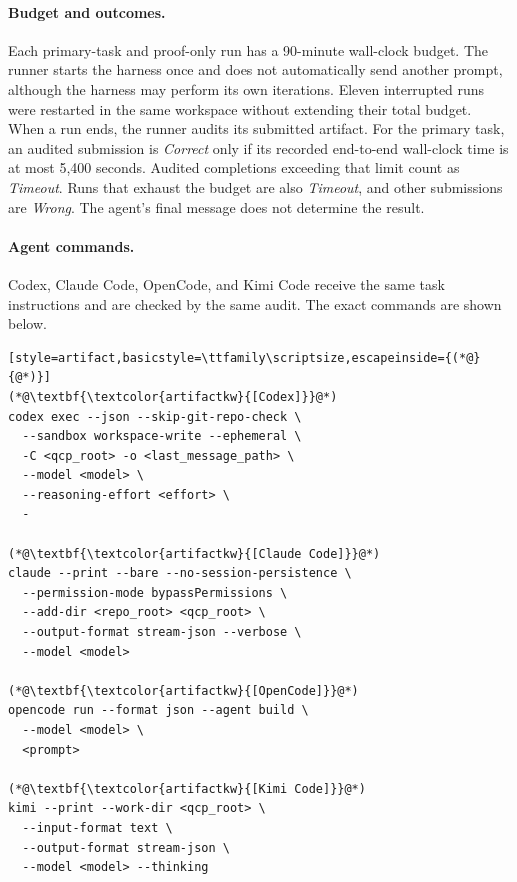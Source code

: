\paragraph{Budget and outcomes.}
Each primary-task and proof-only run has a 90-minute wall-clock budget. The runner starts the harness once and does not automatically send another prompt, although the harness may perform its own iterations. Eleven interrupted runs were restarted in the same workspace without extending their total budget. When a run ends, the runner audits its submitted artifact. For the primary task, an audited submission is \emph{Correct} only if its recorded end-to-end wall-clock time is at most 5,400 seconds. Audited completions exceeding that limit count as \emph{Timeout}. Runs that exhaust the budget are also \emph{Timeout}, and other submissions are \emph{Wrong}. The agent's final message does not determine the result.

\noindent\begin{minipage}{\columnwidth}
\paragraph{\textcolor{gptfivenavy}{Agent commands.}}
Codex, Claude Code, OpenCode, and Kimi Code receive the same task instructions and are checked by the same audit. The exact commands are shown below.

\begin{lstlisting}[style=artifact,basicstyle=\ttfamily\scriptsize,escapeinside={(*@}{@*)}]
(*@\textbf{\textcolor{artifactkw}{[Codex]}}@*)
codex exec --json --skip-git-repo-check \
  --sandbox workspace-write --ephemeral \
  -C <qcp_root> -o <last_message_path> \
  --model <model> \
  --reasoning-effort <effort> \
  -

(*@\textbf{\textcolor{artifactkw}{[Claude Code]}}@*)
claude --print --bare --no-session-persistence \
  --permission-mode bypassPermissions \
  --add-dir <repo_root> <qcp_root> \
  --output-format stream-json --verbose \
  --model <model>

(*@\textbf{\textcolor{artifactkw}{[OpenCode]}}@*)
opencode run --format json --agent build \
  --model <model> \
  <prompt>

(*@\textbf{\textcolor{artifactkw}{[Kimi Code]}}@*)
kimi --print --work-dir <qcp_root> \
  --input-format text \
  --output-format stream-json \
  --model <model> --thinking
\end{lstlisting}
\end{minipage}


